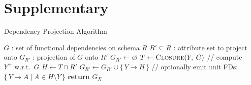 \documentclass[UTF8]{beamer}
\begin{document}
\section{Supplementary}

\begin{frame}{Dependency Projection Algorithm}
\begin{algorithm}[H]
\scriptsize
\caption{Computing FD Projections (closure-based)}
\label{algorithm:algo}
\label{alg:fd-projection-closures}
\begin{algorithmic}[1]
\REQUIRE $G$ : set of functional dependencies on schema $R$
\REQUIRE $R' \subseteq R$ : attribute set to project onto
\ENSURE $G_{R'}$ : projection of $G$ onto $R'$
\STATE $G_{R'} \gets \varnothing$
    \STATE $T \gets \textsc{Closure}(Y,\; G)$ \hfill// compute $Y^+$ w.r.t.\ $G$
    \STATE $H \gets T \cap R'$
    \STATE $G_{R'} \gets G_{R'} \cup \{\, Y \to H \,\}$ \hfill// optionally emit unit FDs: $\{\,Y\to A \mid A \in H\setminus Y\,\}$
\ENDFOR
\STATE \textbf{return} $G_X$
\end{algorithmic}
\end{algorithm}

\end{frame}
\end{document}
